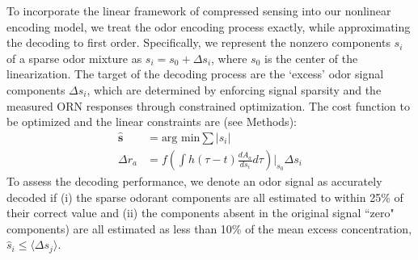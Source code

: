 To incorporate the linear framework of compressed sensing into our nonlinear encoding model, we treat the odor encoding process exactly, while approximating the decoding to first order. Specifically, we represent the nonzero components $s_i$ of a  sparse odor mixture as $s_i = s_0 + \Delta s_i$, where $s_0$ is the center of the linearization. The target of the decoding process are the `excess' odor signal components $\Delta s_i$, which are determined by enforcing signal sparsity and the measured ORN responses through constrained optimization. The cost function to be optimized and the linear constraints are (see Methods):
\begin{align}
\hat {\mathbf s} &= \text{arg min} \sum |s_i| \\
\Delta r_a &= {f}\left(\int h(\tau - t)\frac{dA_a}{ds_i}d \tau\right) \bigg |_{s_0} \Delta s_i
\end{align}
To assess the decoding performance, we denote an odor signal as accurately decoded if (i) the sparse odorant components are all estimated to within 25\% of their correct value and (ii) the components absent in the original signal ``zero" components) are all estimated as less than 10\% of the mean excess concentration, $\hat s_i \le \langle \Delta s_j \rangle$. 





